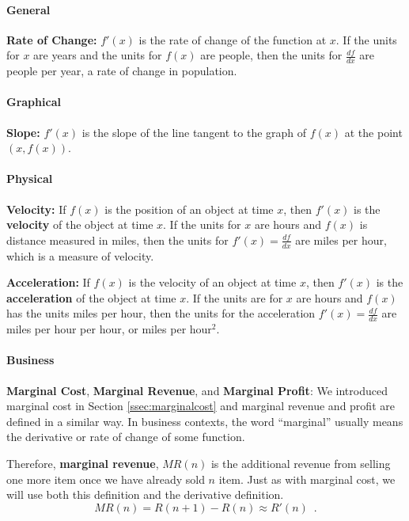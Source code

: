 \paragraph*{General}

{\bf Rate of Change:} $f'(x)$ is the rate of change of the function at $x$. If the units for $x$ are years and the units for $f(x)$ are people, then the units for $\frac{df}{dx}$ are people per year, a rate of change in population.

\paragraph*{Graphical}

{\bf Slope:} $f'(x)$ is the slope of the line tangent to the graph of $f(x)$ at the point $(x,f(x))$.

\paragraph*{Physical}

{\bf Velocity:} If $f(x)$ is the position of an object at time $x$, then $f'(x)$ is the {\bf velocity} of the object at time $x$. If the units for $x$ are hours and $f(x)$ is distance measured in miles, then the units for $f'(x)=\frac{df}{dx}$ are miles per hour, which is a measure of velocity.

{\bf Acceleration:} If $f(x)$ is the velocity of an object at time $x$, then $f'(x)$ is the {\bf acceleration} of the object at time $x$. If the units are for $x$ are hours and $f(x)$ has the units miles per hour, then the units for the acceleration $f'(x)=\frac{df}{dx}$ are miles per hour per hour, or miles per hour$^2$.

\paragraph*{Business}

{\bf Marginal Cost}, {\bf Marginal Revenue}, and {\bf Marginal Profit}: We introduced marginal cost in Section \ref{ssec:marginalcost} and marginal revenue and profit are defined in a similar way. In business contexts, the word ``marginal'' usually means the derivative or rate of change of some function. 

Therefore, {\bf marginal revenue}, $MR(n)$ is the additional revenue from selling one more item once we have already sold $n$ item. Just as with marginal cost, we will use both this definition and the derivative definition.
$$MR(n) = R(n+1)-R(n) \approx R'(n) \enspace.$$

